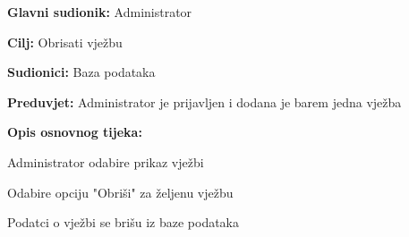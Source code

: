					\noindent {}
					\begin{packed_item}
						
						\item \textbf{Glavni sudionik:} Administrator
						\item  \textbf{Cilj:} Obrisati vježbu
						\item  \textbf{Sudionici:} Baza podataka
						\item  \textbf{Preduvjet:} Administrator je prijavljen i dodana je barem jedna vježba
						\item  \textbf{Opis osnovnog tijeka:}
						
						\item[] \begin{packed_enum}
							
							\item Administrator odabire prikaz vježbi
							\item Odabire opciju "Obriši" za željenu vježbu
							\item Podatci o vježbi se brišu iz baze podataka
							
						\end{packed_enum}
						
						
					\end{packed_item}
				
